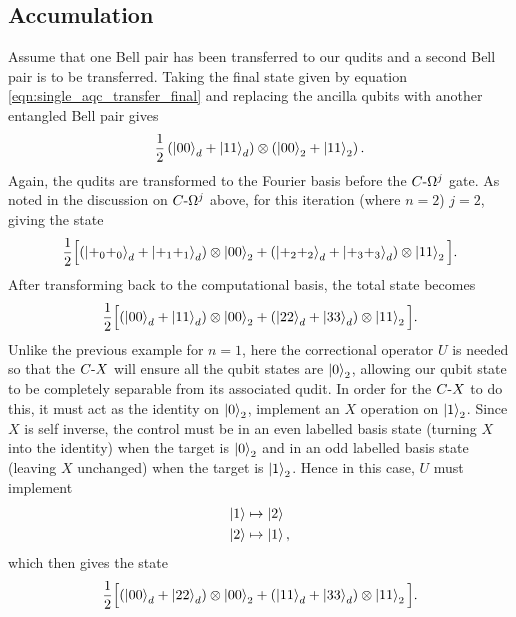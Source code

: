 \subsection{Accumulation}
\label{subsection:accumulation}
Assume that one Bell pair has been transferred to our qudits and a second Bell pair is to be transferred.
Taking the final state given by equation \ref{eqn:single_aqc_transfer_final} and replacing the ancilla qubits with another entangled Bell pair gives
\begin{equation}
    \frac{1}{2}\left(
            \ket{00}_d +\ket{11}_d
        \right)
        \otimes 
        \left(
            \ket{00}_2 +\ket{11}_2
        \right).
\end{equation}
Again, the qudits are transformed to the Fourier basis before the $C\text{-}\Omega^j$ gate.
As noted in the discussion on $C\text{-}\Omega^j$ above, for this iteration (where $n=2$) $j=2$, giving the state
\begin{equation}
    \frac{1}{2}\Big[
            (\ket{+_0 +_0}_d + \ket{+_1 +_1}_d)\otimes\ket{00}_2
            +(\ket{+_2 +_2}_d + \ket{+_3 +_3}_d)\otimes\ket{11}_2
        \Big].
\end{equation}
After transforming back to the computational basis, the total state becomes
\begin{equation}
    \frac{1}{2}\Big[
            (\ket{00}_d + \ket{11}_d)\otimes\ket{00}_2
            +(\ket{22}_d + \ket{33}_d)\otimes\ket{11}_2
        \Big].
\end{equation}
Unlike the previous example for $n=1$, here the correctional operator $U$ is needed so that the $C\text{-}X$ will ensure all the qubit states are $\ket{0}_2$, allowing our qubit state to be completely separable from its associated qudit.
In order for the $C\text{-}X$ to do this, it must act as the identity on $\ket{0}_2$, implement an $X$ operation on $\ket{1}_2$.
Since $X$ is self inverse, the control must be in an even labelled basis state (turning $X$ into the identity) when the target is $\ket{0}_2$ and in an odd labelled basis state (leaving $X$ unchanged) when the target is $\ket{1}_2$.
Hence in this case, $U$ must implement
\begin{align}
    \ket{1} &\mapsto \ket{2}\\
    \ket{2} &\mapsto \ket{1},
\end{align}
which then gives the state
\begin{equation}
    \frac{1}{2}\Big[
            (\ket{00}_d + \ket{22}_d)\otimes\ket{00}_2
            +(\ket{11}_d + \ket{33}_d)\otimes\ket{11}_2
        \Big].
\end{equation}

